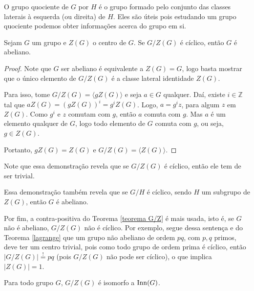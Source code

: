 	\begin{remark}
		O grupo quociente de $G$ por $H$ é o grupo formado pelo conjunto das classes laterais à esquerda 
		(ou direita) de $H$. Eles são úteis pois estudando um grupo quociente podemos obter informações 
		acerca do grupo em si.
	\end{remark}
	\begin{theorem}
	\label{teorema G/Z}
		Sejam $G$ um grupo e $Z(G)$ o centro de $G$. Se $G/Z(G)$ é cíclico, então $G$ é abeliano.
	\end{theorem}
	\begin{proof}
		Note que $G$ ser abeliano é equivalente a $Z(G) = G$, logo basta mostrar que o único elemento 
		de $G/Z(G)$ é a classe lateral identidade $Z(G)$.
		\par\vspace{0.3cm} Para isso, tome $G/Z(G) = \langle gZ(G) \rangle$ e seja $a\in G$ qualquer. 
		Daí, existe $i\in\mathbb{Z}$ tal que $aZ(G) = (gZ(G))^i = g^iZ(G)$. Logo, $a = g^iz$, para algum 
		$z$ em $Z(G)$. Como $g^i$ e $z$ comutam com $g$, então $a$ comuta com $g$. Mas $a$ é um elemento 
		qualquer de $G$, logo todo elemento de $G$ comuta com $g$, ou seja, $g\in Z(G)$.
		\par\vspace{0.3cm} Portanto, $gZ(G) = Z(G)$ e $G/Z(G) = \langle Z(G) \rangle$.
	\end{proof}
	\begin{remark}
		Note que essa demonstração revela que se $G/Z(G)$ é cíclico, então ele tem de ser trivial.
	\end{remark}
	\begin{remark}
		Essa demonstração também revela que se $G/H$ é cíclico, sendo $H$ um subgrupo de $Z(G)$, 
		então $G$ é abeliano.
	\end{remark}
	\begin{remark}
		Por fim, a contra-positiva do Teorema \ref{teorema G/Z} é mais usada, isto é, se $G$ não é abeliano,
		$G/Z(G)$ não é cíclico. Por exemplo, segue dessa sentença e do Teorema \ref{lagrange} que 
		um grupo não abeliano de ordem $pq$, com $p, q$ primos, deve ter um centro trivial, pois como todo 
		grupo de ordem prima é cíclico, então $|G/Z(G)| \overset{!}{=} pq$ 
		(pois $G/Z(G)$ não pode ser cíclico), 
		o que implica $|Z(G)| = 1$. 
	\end{remark}
	\begin{theorem}
		Para todo grupo $G$, $G/Z(G)$ é isomorfo a $\operatorname{Inn}(G)$.
	\end{theorem}
